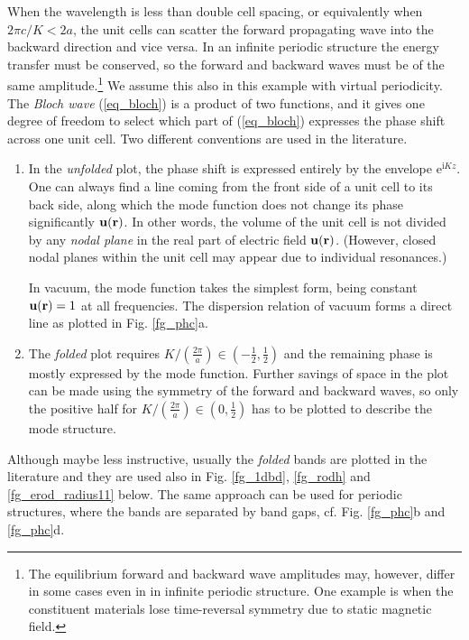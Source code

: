 When the wavelength is less than double cell spacing, or equivalently when $2\pi c /K < 2 a$, the unit cells can scatter the forward propagating wave into the backward direction and vice versa. In an infinite periodic structure the energy transfer must be conserved, so the forward and backward waves must be of the same amplitude.\footnote{The equilibrium forward and backward wave amplitudes may, however, differ in some cases even in in infinite periodic structure. One example is when the constituent materials lose time-reversal symmetry due to static magnetic field.} We assume this also in this example with virtual periodicity. The \textit{Bloch wave} (\ref{eq_bloch}) is a product of two functions, and it gives one degree of freedom to select which part of (\ref{eq_bloch}) expresses the phase shift across one unit cell. Two different conventions are used in the literature.
\begin{enumerate}
 \item{In the \textit{unfolded} plot, the phase shift is expressed entirely by the envelope $\mathrm{e}^{\mathrm{i}Kz}$. One can always find a line coming from the front side of a unit cell to its back side, along which the mode function does not change its phase significantly $\mathbf{u({\mathbf{r}})}$. In other words, the volume of the unit cell is not divided by any \textit{nodal plane} in the real part of electric field  $\mathbf{u({\mathbf{r}})}$. (However, closed nodal planes within the unit cell may appear due to individual resonances.)

In vacuum, the mode function takes the simplest form, being constant $\mathbf{u({\mathbf{r}})} = 1$ at all frequencies. The dispersion relation of vacuum forms a direct line as plotted in Fig. \ref{fg_phc}a.} 
 \item{The \textit{folded} plot requires $K/\left(\frac{2\pi}{a}\right) \in (-\frac{1}{2}, \frac{1}{2})$ and the remaining phase is mostly expressed by the mode function. 
Further savings of space in the plot can be made using the symmetry of the forward and backward waves, so only the positive half for $K/\left(\frac{2\pi}{a}\right) \in (0, \frac{1}{2})$ has to be plotted to describe the mode structure.} 
 \end{enumerate}
Although maybe less instructive, usually the \textit{folded} bands are plotted in the literature and they are used also in Fig. \ref{fg_1dbd}, \ref{fg_rodh} and \ref{fg_erod_radius11} below. The same approach can be used for periodic structures, where the bands are separated by band gaps, cf. Fig. \ref{fg_phc}b and \ref{fg_phc}d.
